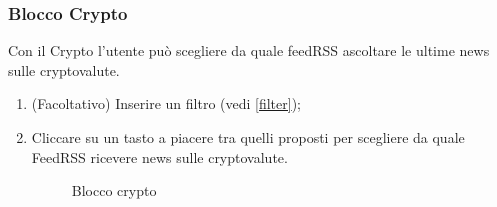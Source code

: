 \subsubsection{Blocco Crypto}
Con il Crypto l'utente può scegliere da quale feedRSS ascoltare le ultime news sulle cryptovalute.
\begin{enumerate}
	\item (Facoltativo) Inserire un filtro (vedi \ref{filter});
	\item Cliccare su un tasto a piacere tra quelli proposti per scegliere da quale FeedRSS ricevere news sulle cryptovalute.
\begin{figure}[!ht]
	\centering
	\caption{Blocco crypto}
\end{figure}
\end{enumerate}
\newpage

